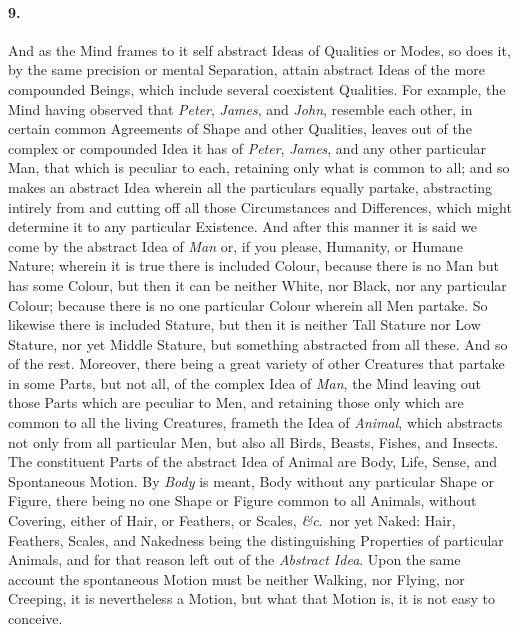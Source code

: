 \documentclass[]{article}
\newenvironment{sectionbody}{}{}
\begin{document}
\begin{sectionbody}
\paragraph{9.} And as the Mind frames to it self abstract Ideas of Qualities or
Modes, so does it, by the same precision or mental Separation,
attain abstract Ideas of the more compounded Beings, which
include several coexistent Qualities.  For example, the Mind
having observed that \emph{Peter}, \emph{James}, and
\emph{John}, resemble each other, in certain common Agreements
of Shape and other Qualities, leaves out of the complex or
compounded Idea it has of \emph{Peter}, \emph{James}, and any
other particular Man, that which is peculiar to each, retaining
only what is common to all; and so makes an abstract Idea wherein
all the particulars equally partake, abstracting intirely from
and cutting off all those Circumstances and Differences, which
might determine it to any particular Existence.  And after this
manner it is said we come by the abstract Idea of \emph{Man}
or, if you please, Humanity, or Humane Nature; wherein it is true
there is included Colour, because there is no Man but has some
Colour, but then it can be neither White, nor Black, nor any
particular Colour; because there is no one particular Colour
wherein all Men partake.  So likewise there is included Stature,
but then it is neither Tall Stature nor Low Stature, nor yet
Middle Stature, but something abstracted from all these.  And so
of the rest.  Moreover, there being a great variety of other
Creatures that partake in some Parts, but not all, of the complex
Idea of \emph{Man}, the Mind leaving out those Parts which are
peculiar to Men, and retaining those only which are common to all
the living Creatures, frameth the Idea of \emph{Animal}, which
abstracts not only from all particular Men, but also all Birds,
Beasts, Fishes, and Insects.  The constituent Parts of the
abstract Idea of Animal are Body, Life, Sense, and Spontaneous
Motion.  By \emph{Body} is meant, Body without any particular
Shape or Figure, there being no one Shape or Figure common to all
Animals, without Covering, either of Hair, or Feathers, or
Scales, \emph{\&c}.\ nor yet Naked: Hair, Feathers, Scales,
and Nakedness being the distinguishing Properties of particular
Animals, and for that reason left out of the \emph{Abstract
Idea}.  Upon the same account the spontaneous Motion must be
neither Walking, nor Flying, nor Creeping, it is nevertheless a
Motion, but what that Motion is, it is not easy to conceive.




\end{sectionbody}
\end{document}

